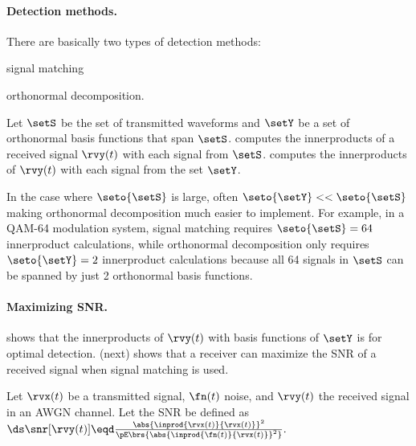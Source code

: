 \begin{proposition}
\paragraph{Detection methods.}
There are basically two types of detection methods:
\begin{enume}
   \item signal matching
   \item orthonormal decomposition.
\end{enume}

Let $\setS$ be the set of transmitted waveforms and
$\setY$ be a set of orthonormal basis functions that span $\setS$.
 computes the innerproducts of a
received signal $\rvy(t)$ with each signal from $\setS$.
 computes the innerproducts of
$\rvy(t)$ with each signal from the set $\setY$.

In the case where $\seto{\setS}$ is large, often $\seto{\setY}<<\seto{\setS}$
making orthonormal decomposition much easier to implement.
For example, in a QAM-64 modulation system,
signal matching requires $\seto{\setS}=64$ innerproduct calculations,
while orthonormal decomposition only requires $\seto{\setY}=2$
innerproduct calculations because all 64 signals in $\setS$ can be spanned
by just 2 orthonormal basis functions.

\paragraph{Maximizing SNR.}
 shows that the innerproducts of $\rvy(t)$ with
basis functions of $\setY$ is  for optimal detection.
 (next) shows that a receiver can
maximize the SNR of a received signal when signal matching is used.

\begin{theorem}
\label{thm:mf_maxSNR}
Let $\rvx(t)$ be a transmitted signal, $\fn(t)$ noise, and $\rvy(t)$ the received signal
in an AWGN channel.
Let the  SNR be defined as
\\\indentx$\ds
      \snr[\rvy(t)] \eqd \frac{\abs{\inprod{\rvx(t)}{\rvx(t)}}^2}
                            {\pE\brs{\abs{\inprod{\fn(t)}{\rvx(t)}}^2}}.
          $
\end{theorem}


\end{proposition}
